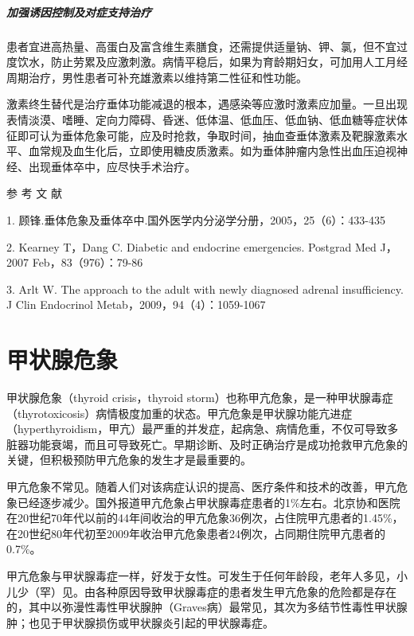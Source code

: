 \paragraph{加强诱因控制及对症支持治疗}

患者宜进高热量、高蛋白及富含维生素膳食，还需提供适量钠、钾、氯，但不宜过度饮水，防止劳累及应激刺激。病情平稳后，如果为育龄期妇女，可加用人工月经周期治疗，男性患者可补充雄激素以维持第二性征和性功能。

激素终生替代是治疗垂体功能减退的根本，遇感染等应激时激素应加量。一旦出现表情淡漠、嗜睡、定向力障碍、昏迷、低体温、低血压、低血钠、低血糖等症状体征即可认为垂体危象可能，应及时抢救，争取时间，抽血查垂体激素及靶腺激素水平、血常规及血生化后，立即使用糖皮质激素。如为垂体肿瘤内急性出血压迫视神经、出现垂体卒中，应尽快手术治疗。
\protect\hypertarget{text00111.html}{}{}

\hypertarget{text00111.htmlux5cux23CHP4-8-4}{}
参 考 文 献

1. 顾锋.垂体危象及垂体卒中.国外医学内分泌学分册，2005，25（6）：433-435

2. Kearney T，Dang C. Diabetic and endocrine emergencies. Postgrad Med
J，2007 Feb，83（976）：79-86

3. Arlt W. The approach to the adult with newly diagnosed adrenal
insufficiency. J Clin Endocrinol Metab，2009，94（4）：1059-1067

\protect\hypertarget{text00112.html}{}{}

\chapter{甲状腺危象}

甲状腺危象（thyroid crisis，thyroid
storm）也称甲亢危象，是一种甲状腺毒症（thyrotoxicosis）病情极度加重的状态。甲亢危象是甲状腺功能亢进症（hyperthyroidism，甲亢）最严重的并发症，起病急、病情危重，不仅可导致多脏器功能衰竭，而且可导致死亡。早期诊断、及时正确治疗是成功抢救甲亢危象的关键，但积极预防甲亢危象的发生才是最重要的。

甲亢危象不常见。随着人们对该病症认识的提高、医疗条件和技术的改善，甲亢危象已经逐步减少。国外报道甲亢危象占甲状腺毒症患者的1\%左右。北京协和医院在20世纪70年代以前的44年间收治的甲亢危象36例次，占住院甲亢患者的1.45\%，在20世纪80年代初至2009年收治甲亢危象患者24例次，占同期住院甲亢患者的0.7\%。

甲亢危象与甲状腺毒症一样，好发于女性。可发生于任何年龄段，老年人多见，小儿少（罕）见。由各种原因导致甲状腺毒症的患者发生甲亢危象的危险都是存在的，其中以弥漫性毒性甲状腺肿（Graves病）最常见，其次为多结节性毒性甲状腺肿；也见于甲状腺损伤或甲状腺炎引起的甲状腺毒症。

